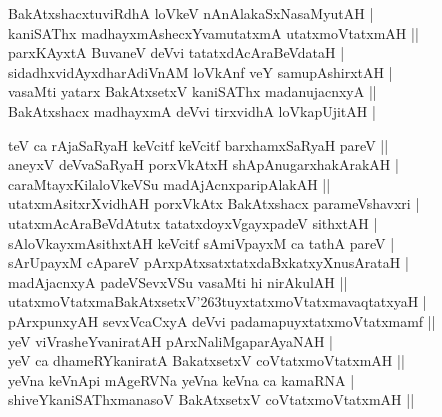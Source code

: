 \begin{entry}
\smallskip
\begin{shl}
BakAtxshacxtuviRdhA loVkeV nAnAlakaSxNasaMyutAH |\\[1pt]
kaniSAThx madhayxmAshecxYvamutatxmA utatxmoVtatxmAH ||\\[1pt]
parxKAyxtA BuvaneV deVvi tatatxdAcAraBeVdataH |\\[1pt]
sidadhxvidAyxdharAdiVnAM loVkAnf veY samupAshirxtAH |\\[1pt]
vasaMti yatarx BakAtxsetxV kaniSAThx madanujacnxyA ||\\[1pt]
BakAtxshacx madhayxmA deVvi tirxvidhA loVkapUjitAH |
\end{shl}
\begin{shl}
teV ca rAjaSaRyaH keVcitf keVcitf barxhamxSaRyaH pareV ||\\[1pt]
aneyxV deVvaSaRyaH porxVkAtxH shApAnugarxhakArakAH |\\[1pt]
caraMtayxKilaloVkeVSu madAjAcnxparipAlakAH ||\\[1pt]
utatxmAsitxrXvidhAH porxVkAtx BakAtxshacx parameVshavxri |\\[1pt]
utatxmAcAraBeVdAtutx tatatxdoyxVgayxpadeV sithxtAH |\\[1pt]
sAloVkayxmAsithxtAH keVcitf sAmiVpayxM ca tathA pareV |\\[1pt]
sArUpayxM cApareV pArxpAtxsatxtatxdaBxkatxyXnusArataH |\\[1pt]
madAjacnxyA padeVSevxVSu vasaMti hi nirAkulAH ||\\[1pt]
utatxmoVtatxmaBakAtxsetxV{\char'263}tuyxtatxmoVtatxmavaqtatxyaH |\\[1pt]
pArxpunxyAH sevxVcaCxyA deVvi padamapuyxtatxmoVtatxmamf ||\\[1pt]
yeV viVrasheYvaniratAH pArxNaliMgaparAyaNAH |\\[1pt]
yeV ca dhameRYkaniratA BakatxsetxV coVtatxmoVtatxmAH ||\\[1pt]
yeVna keVnApi mAgeRVNa yeVna keVna ca kamaRNA |\\[1pt]
shiveYkaniSAThxmanasoV BakAtxsetxV coVtatxmoVtatxmAH ||
\end{shl}
\medskip
{}
\end{entry}

